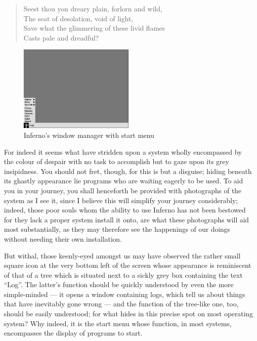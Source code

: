 \documentclass[a5paper,twoside,12pt]{report}
\begin{document}
  \begin{quote}
    Seest thou yon dreary plain, forlorn and wild, \\
    The seat of desolation, void of light, \\
    Save what the glimmering of these livid flames \\
    Casts pale and dreadful?
  \end{quote}

  \begin{figure}
    \centering
    \includegraphics[width=0.5\textwidth]{imgs/start_menu.png}
    \caption{Inferno's window manager with start menu}
  \end{figure}

  For indeed it seems what have stridden upon a system wholly encompassed by the colour of despair with no task to accomplish but to gaze upon its grey insipidness. You should not fret, though, for this is but a disguise; hiding beneath its ghastly appearance lie programs who are waiting eagerly to be used. To aid you in your journey, you shall henceforth be provided with photographs of the system as I see it, since I believe this will simplify your journey considerably; indeed, those poor souls whom the ability to use Inferno has not been bestowed for they lack a proper system install it onto, are what these photographs will aid most substantially, as they may therefore see the happenings of our doings without needing their own installation.

  But withal, those keenly-eyed amongst us may have observed the rather small square icon at the very bottom left of the screen whose appearance is reminiscent of that of a tree which is situated next to a sickly grey box containing the text ``Log''. The latter's function should be quickly understood by even the more simple-minded — it opens a window containing logs, which tell us about things that have inevitably gone wrong — and the function of the tree-like one, too, should be easily understood; for what hides in this precise spot on most operating system? Why indeed, it is the start menu whose function, in most systems, encompasses the display of programs to start.
\end{document}
